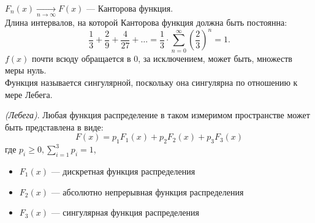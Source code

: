 \begin{example}
	$F_n(x) \underset{n \to \infty}{\rightarrow} F(x)$ --- Канторова функция. \\
	Длина интервалов, на которой Канторова функция должна быть постоянна:
	\[
		\frac{1}{3} + \frac{2}{9} + \frac{4}{27} + \ldots = \frac{1}{3} \cdot \sum\limits_{n = 0}^\infty (\frac{2}{3})^n = 1.
	\]
	$f(x)$ почти всюду обращается в 0, за исключением, может быть, множеств меры нуль. \\
	Функция называется сингулярной, поскольку она сингулярна по отношению к мере Лебега.
\end{example}
\begin{theorem} \textit{(Лебега)}.  
	Любая функция распределение в таком измеримом пространстве может быть представлена в виде:
	\[
		F(x) = p_1 F_1(x) + p_2 F_2(x) + p_3 F_3(x)
	\]
	где $p_i \geqslant 0, \sum\limits_{i=1}^3 p_i = 1$,
	\begin{itemize}
		\item $F_1 (x)$ --- дискретная функция распределения
		\item $F_2 (x)$ --- абсолютно непрерывная функция распределения
		\item $F_3 (x)$ --- сингулярная функция распределения
	\end{itemize}
\end{theorem}

\setcounter{equation}{0}
